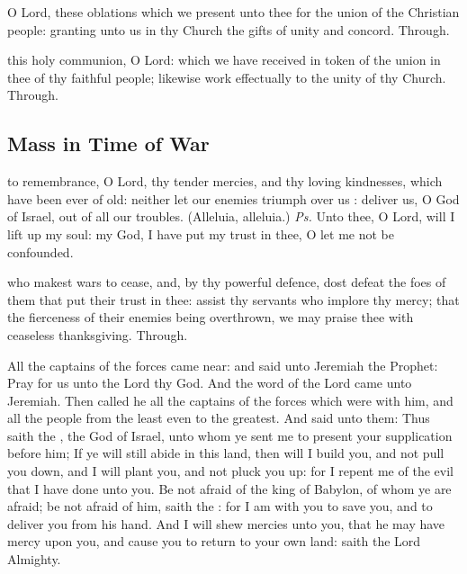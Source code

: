 \secret
{} O Lord, these oblations which we present unto thee for the union of the Christian people: granting unto us in thy Church the gifts of unity and concord. Through.


\postcommunion
{} this holy communion, O Lord: which we have received in token of the union in thee of thy faithful people; likewise work effectually to the unity of thy Church. Through.


\subsection{Mass in Time of War}

\introit
{} to remembrance, O Lord, thy tender mercies, and thy loving kindnesses, which have been ever of old: neither let our enemies triumph over us : deliver us, O God of Israel, out of all our troubles. (Alleluia, alleluia.) \textit{Ps.} Unto thee, O Lord, will I lift up my soul: my God, I have put my trust in thee, O let me not be confounded.

\collect
{} who makest wars to cease, and, by thy powerful defence, dost defeat the foes of them that put their trust in thee: assist thy servants who implore thy mercy; that the fierceness of their enemies being overthrown, we may praise thee with ceaseless thanksgiving. Through.

 All the captains of the forces came near: and said unto Jeremiah the Prophet: Pray for us unto the Lord thy God. And the word of the Lord came unto Jeremiah. Then called he all the captains of the forces which were with him, and all the people from the least even to the greatest. And said unto them: Thus saith the , the God of Israel, unto whom ye sent me to present your supplication before him; If ye will still abide in this land, then will I build you, and not pull you down, and I will plant you, and not pluck you up: for I repent me of the evil that I have done unto you. Be not afraid of the king of Babylon, of whom ye are afraid; be not afraid of him, saith the : for I am with you to save you, and to deliver you from his hand. And I will shew mercies unto you, that he may have mercy upon you, and cause you to return to your own land: saith the Lord Almighty.

